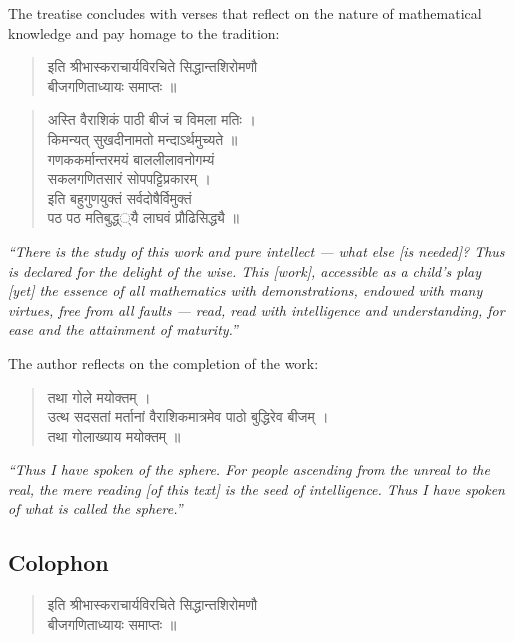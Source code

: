 \documentclass[11pt,a4paper]{article}
\newcommand{\cnote}[1]{\textcolor{notecolor}{\textit{#1}}}
\newcommand{\dev}[1]{{\devanagarifont #1}}
\newenvironment{sanskritverse}{%
  \begin{quote}
}{%
  \end{quote}
}
\begin{document}
The treatise concludes with verses that reflect on the nature of mathematical knowledge and pay homage to the tradition:

\begin{sanskritverse}
\dev{%
इति श्रीभास्कराचार्यविरचिते सिद्धान्तशिरोमणौ\\
बीजगणिताध्यायः समाप्तः ॥}
\end{sanskritverse}

\begin{sanskritverse}
\dev{%
अस्ति वैराशिकं पाठी बीजं च विमला मतिः ।\\
किमन्यत् सुखदीनामतो मन्दाऽर्थमुच्यते ॥\\[0.5em]
गणककर्मान्तरमयं बाललीलावनोगम्यं\\
सकलगणितसारं सोपपट्टिप्रकारम् ।\\
इति बहुगुणयुक्तं सर्वदोषैर्विमुक्तं\\
पठ पठ मतिबुद्ध्‌्यै लाघवं प्रौढिसिद्ध्यै ॥}
\end{sanskritverse}

\cnote{``There is the study of this work and pure intellect --- what else [is needed]? Thus is declared for the delight of the wise. This [work], accessible as a child's play [yet] the essence of all mathematics with demonstrations, endowed with many virtues, free from all faults --- read, read with intelligence and understanding, for ease and the attainment of maturity.''}

\bigskip

The author reflects on the completion of the work:

\begin{sanskritverse}
\dev{%
तथा गोले मयोक्तम् ।\\
उत्थ सदसतां मर्तानां वैराशिकमात्रमेव पाठो बुद्धिरेव बीजम् ।\\
तथा गोलाख्याय मयोक्तम् ॥}
\end{sanskritverse}

\cnote{``Thus I have spoken of the sphere. For people ascending from the unreal to the real, the mere reading [of this text] is the seed of intelligence. Thus I have spoken of what is called the sphere.''}

\subsection*{Colophon}

\begin{sanskritverse}
\dev{%
इति श्रीभास्कराचार्यविरचिते सिद्धान्तशिरोमणौ\\
बीजगणिताध्यायः समाप्तः ॥}
\end{sanskritverse}
\end{document}
